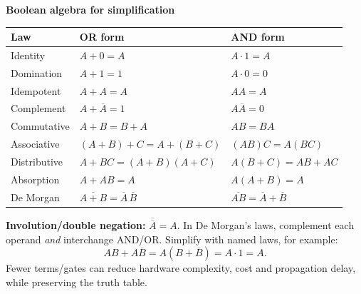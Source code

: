 \documentclass[a4paper,12pt]{article}
\begin{document}
\textbf{Boolean algebra for simplification}
\begin{center}
\begin{tabularx}{0.98\linewidth}{p{3.2cm} X X}
\toprule
\textbf{Law} & \textbf{OR form} & \textbf{AND form} \\
\midrule
Identity & $A+0=A$ & $A\cdot1=A$ \\
Domination & $A+1=1$ & $A\cdot0=0$ \\
Idempotent & $A+A=A$ & $AA=A$ \\
Complement & $A+\overline{A}=1$ & $A\overline{A}=0$ \\
Commutative & $A+B=B+A$ & $AB=BA$ \\
Associative & $(A+B)+C=A+(B+C)$ & $(AB)C=A(BC)$ \\
Distributive & $A+BC=(A+B)(A+C)$ & $A(B+C)=AB+AC$ \\
Absorption & $A+AB=A$ & $A(A+B)=A$ \\
De Morgan & $\overline{A+B}=\overline{A}\,\overline{B}$ & $\overline{AB}=\overline{A}+\overline{B}$ \\
\bottomrule
\end{tabularx}
\end{center}
\textbf{Involution/double negation:} $\overline{\overline{A}}=A$. In De Morgan's laws, complement each operand \emph{and} interchange AND/OR. Simplify with named laws, for example:
\[
AB+A\overline{B}=A(B+\overline{B})=A\cdot1=A.
\]
Fewer terms/gates can reduce hardware complexity, cost and propagation delay, while preserving the truth table.
\end{document}
